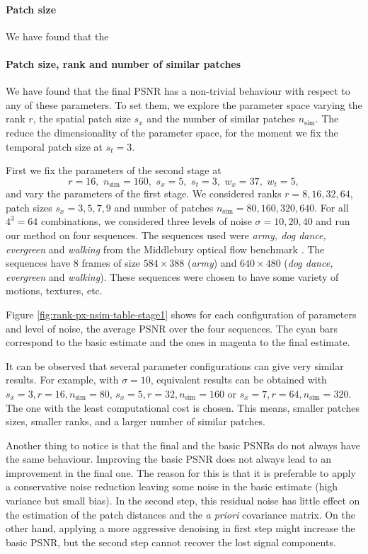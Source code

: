 \documentclass[10pt, journal, twocolumn, final, a4paper]{IEEEtran}
\begin{document}
\paragraph{Patch size} We have found that the

\paragraph{Patch size, rank and number of similar patches} We have found that the
final PSNR has a non-trivial behaviour with respect to any of these parameters.
To set them, we explore the parameter space varying the rank $r$, the spatial
patch size $s_x$ and the number of similar patches $n_{\text{sim}}$. The reduce
the dimensionality of the parameter space, for the moment we fix the temporal
patch size at $s_t = 3$.

First we fix the parameters of the second stage at 
\[r = 16,\,\, n_{\text{sim}} = 160,\,\, s_x = 5,\,\, s_t = 3,\,\, w_x = 37,\,\, w_t = 5,\]
and vary the parameters of the first stage. We considered ranks $r = 8, 16, 32, 64$,   
patch sizes $s_x = 3,5,7,9$ and number of patches $n_{\text{sim}} = 80, 160, 320, 640$.
For all $4^3 = 64$ combinations, we considered three levels of noise $\sigma = 10, 20, 40$
and run our method on four sequences. The
sequences used were \emph{army, dog dance, evergreen} and \emph{walking} from
the Middlebury optical flow benchmark \cite{middleburyOflow}.
The sequences have 8 frames of size $584 \times 388$ (\emph{army}) and $640
\times 480$ (\emph{dog dance, evergreen} and \emph{walking}).
These sequences were chosen to have some variety of motions, textures, etc.

Figure \ref{fig:rank-px-nsim-table-stage1} shows for each configuration of
parameters and level of noise, the average PSNR over the four sequences. The
cyan bars correspond to the basic estimate and the ones in magenta to the final
estimate.

It can be observed that several parameter configurations can give very similar
results. For example, with $\sigma = 10$, equivalent results can be obtained 
with $s_x = 3, r = 16, n_{\text{sim}} = 80$, $s_x = 5, r = 32, n_{\text{sim}} = 160$
or  $s_x = 7, r = 64, n_{\text{sim}} = 320$.
The one with the least computational cost is chosen. This means,
smaller patches sizes, smaller ranks, and a larger number of similar patches.

Another thing to notice is that the final and the basic PSNRs do not always
have the same behaviour. Improving the basic PSNR does not always lead to an
improvement in the final one. The reason for this is that it is preferable to
apply a conservative noise reduction leaving some noise in the basic estimate
(high variance but small bias). In the second step, this residual noise has
little effect on the estimation of the patch distances and the \emph{a priori} covariance
matrix. On the other hand, applying a more aggressive denoising in first step
might increase the basic PSNR, but the second step cannot recover the lost
signal components.
\end{document}
